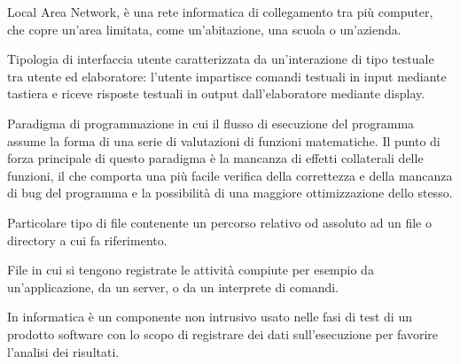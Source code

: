 \begin{itemize}


Local Area Network, è una rete informatica di collegamento tra più computer, che copre un'area limitata, come un'abitazione, una scuola o un'azienda.


Tipologia di interfaccia utente caratterizzata da un'interazione di tipo testuale tra utente ed elaboratore: l'utente impartisce comandi testuali in input mediante tastiera e riceve risposte testuali in output dall'elaboratore mediante display.


Paradigma di programmazione in cui il flusso di esecuzione del programma assume la forma di una serie di valutazioni di funzioni matematiche. Il punto di forza principale di questo paradigma è la mancanza di effetti collaterali delle funzioni, il che comporta una più facile verifica della correttezza e della mancanza di bug del programma e la possibilità di una maggiore ottimizzazione dello stesso.


Particolare tipo di file contenente un percorso relativo od assoluto ad un file o directory a cui fa riferimento.


File in cui si tengono registrate le attività compiute per esempio da un'applicazione, da un server, o da un interprete di comandi.


In informatica è un componente non intrusivo usato nelle fasi di test di un prodotto software con lo scopo di registrare dei dati sull'esecuzione per favorire l'analisi dei risultati.

\end{itemize}


